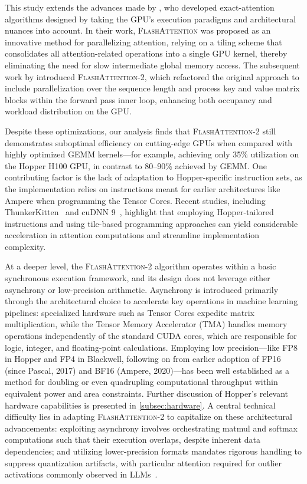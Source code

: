 This study extends the advances made by \citet{dao2022flashattention}, who developed exact-attention algorithms designed by taking the GPU's execution paradigms and architectural nuances into account. In their work, \textsc{FlashAttention} was proposed as an innovative method for parallelizing attention, relying on a tiling scheme that consolidates all attention-related operations into a single GPU kernel, thereby eliminating the need for slow intermediate global memory access. The subsequent work by \citet{dao2023flashattention2} introduced \textsc{FlashAttention-2}, which refactored the original approach to include parallelization over the sequence length and process key and value matrix blocks within the forward pass inner loop, enhancing both occupancy and workload distribution on the GPU.

Despite these optimizations, our analysis finds that \textsc{FlashAttention-2} still demonstrates suboptimal efficiency on cutting-edge GPUs when compared with highly optimized GEMM kernels—for example, achieving only 35\% utilization on the Hopper H100 GPU, in contrast to 80–90\% achieved by GEMM. One contributing factor is the lack of adaptation to Hopper-specific instruction sets, as the implementation relies on instructions meant for earlier architectures like Ampere when programming the Tensor Cores. Recent studies, including ThunkerKitten~\citep{spector2024thunder} and cuDNN 9~\citep{cudnn9}, highlight that employing Hopper-tailored instructions and using tile-based programming approaches can yield considerable acceleration in attention computations and streamline implementation complexity.

At a deeper level, the \textsc{FlashAttention-2} algorithm operates within a basic synchronous execution framework, and its design does not leverage either asynchrony or low-precision arithmetic. Asynchrony is introduced primarily through the architectural choice to accelerate key operations in machine learning pipelines: specialized hardware such as Tensor Cores expedite matrix multiplication, while the Tensor Memory Accelerator (TMA) handles memory operations independently of the standard CUDA cores, which are responsible for logic, integer, and floating-point calculations. Employing low precision—like FP8 in Hopper and FP4 in Blackwell, following on from earlier adoption of FP16 (since Pascal, 2017) and BF16 (Ampere, 2020)—has been well established as a method for doubling or even quadrupling computational throughput within equivalent power and area constraints. Further discussion of Hopper's relevant hardware capabilities is presented in \cref{subsec:hardware}.
A central technical difficulty lies in adapting \textsc{FlashAttention-2} to capitalize on these architectural advancements: exploiting asynchrony involves orchestrating matmul and softmax computations such that their execution overlaps, despite inherent data dependencies; and utilizing lower-precision formats mandates rigorous handling to suppress quantization artifacts, with particular attention required for outlier activations commonly observed in LLMs~\citep{dettmers2208llm, sun2024massive}.


